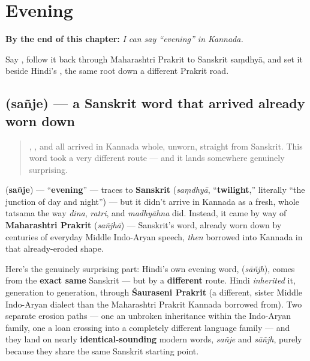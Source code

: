 
\chapter{Evening}
\label{ch:ka-evening}

\begin{chapteropening}
\textbf{By the end of this chapter:} \emph{I can say \textquotedblleft{}evening\textquotedblright{} in Kannada.}

Say , follow it back through Maharashtri Prakrit to Sanskrit saṃdhyā, and set it beside Hindi's , the same root down a different Prakrit road.
\end{chapteropening}

\section[\texorpdfstring{\kn{ಸಂಜೆ} (sañje)}{ಸಂಜೆ (sañje)}]{ (sañje) — a Sanskrit word that arrived already worn down}

\label{lesson:KA-C27-sanje}



\begin{quote}
, , and  all arrived in Kannada whole, unworn, straight from Sanskrit. This word took a very different route — and it lands somewhere genuinely surprising.
\end{quote}

\begin{cousinweb}
\textbf{} (\textbf{sañje}) — \textquotedblleft{}\textbf{evening}\textquotedblright{} — traces to \textbf{Sanskrit} \textbf{} (\emph{saṃdhyā}, \textquotedblleft{}\textbf{twilight},\textquotedblright{} literally \textquotedblleft{}the junction of day and night\textquotedblright{}) — but it didn't arrive in Kannada as a fresh, whole tatsama the way \emph{dina}, \emph{ratri}, and \emph{madhyāhna} did. Instead, it came by way of \textbf{Maharashtri Prakrit} \textbf{} (\emph{sañjhā}) — Sanskrit's word, already worn down by centuries of everyday Middle Indo-Aryan speech, \emph{then} borrowed into Kannada in that already-eroded shape.
\end{cousinweb}

\begin{cousinweb}
Here's the genuinely surprising part: Hindi's own evening word, \textbf{} (\emph{sāñjh}), comes from the \textbf{exact same} Sanskrit \textbf{} — but by a \textbf{different} route. Hindi \emph{inherited} it, generation to generation, through \textbf{Śauraseni Prakrit} (a different, sister Middle Indo-Aryan dialect than the Maharashtri Prakrit Kannada borrowed from). Two separate erosion paths — one an unbroken inheritance within the Indo-Aryan family, one a loan crossing into a completely different language family — and they land on nearly \textbf{identical-sounding} modern words, \emph{sañje} and \emph{sāñjh}, purely because they share the same Sanskrit starting point.
\end{cousinweb}

